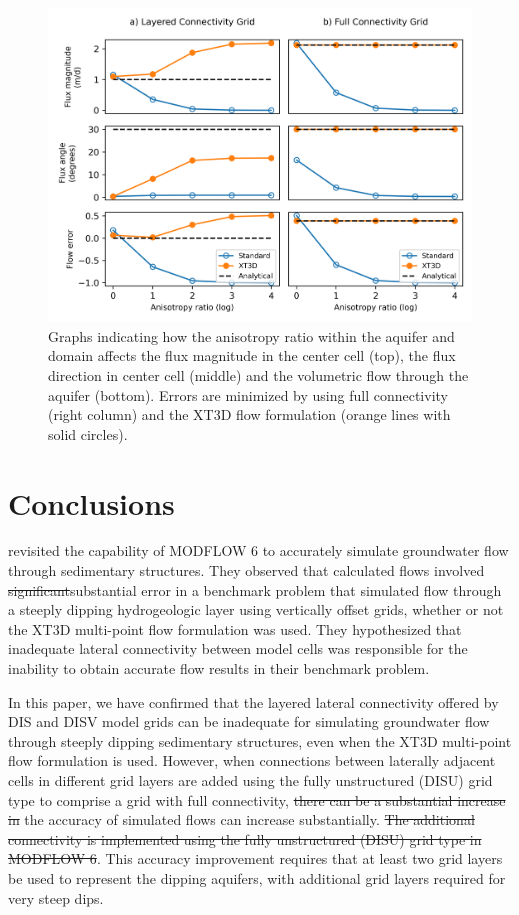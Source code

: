 \documentclass{article}
\begin{document}
\begin{figure}
	\begin{center}
	\includegraphics[scale=0.9]{../figures/fig5_paper.png}
	\caption{Graphs indicating how the anisotropy ratio within the aquifer and domain affects the flux magnitude in the center cell (top), the flux direction in center cell (middle) and the volumetric flow through the aquifer (bottom). Errors are minimized by using full connectivity (right column) and the XT3D flow formulation (orange lines {\color{red}with solid circles}).}
	\label{fig:fig5}
	\end{center}
\end{figure}

\section*{Conclusions}

\cite{bardot2023} revisited the capability of MODFLOW 6 to accurately simulate groundwater flow through sedimentary structures. They observed that calculated flows involved {\color{red} \sout{significant}substantial} error in a benchmark problem that simulated flow through a steeply dipping hydrogeologic layer using vertically offset grids, whether or not the XT3D multi-point flow formulation was used. They hypothesized that inadequate lateral connectivity between model cells was responsible for the inability to obtain accurate flow results in their benchmark problem.

In this paper, we have confirmed that the layered lateral connectivity offered by DIS and DISV model grids can be inadequate for simulating groundwater flow through steeply dipping sedimentary structures, even when the XT3D multi-point flow formulation is used.  However, when connections between laterally adjacent cells in different grid layers are added {\color{red}using the fully unstructured (DISU) grid type} to comprise a grid with full connectivity, {\color{red} \sout{there can be a substantial increase in }}the accuracy of simulated flows {\color{red}can increase substantially.\sout{  The additional connectivity is implemented using the fully unstructured (DISU) grid type in MODFLOW 6}}. This accuracy improvement requires that at least two grid layers be used to represent the dipping aquifers, with additional grid layers required for very steep dips.
\end{document}
